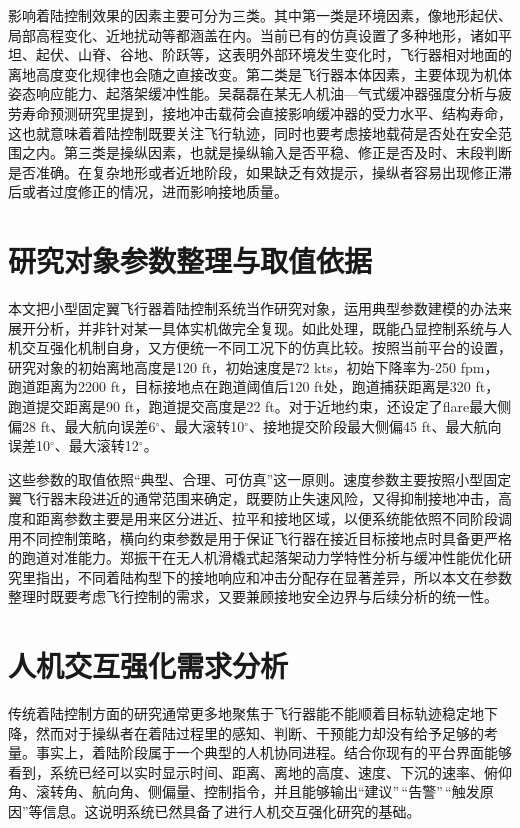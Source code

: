 影响着陆控制效果的因素主要可分为三类。其中第一类是环境因素，像地形起伏、局部高程变化、近地扰动等都涵盖在内。当前已有的仿真设置了多种地形，诸如平坦、起伏、山脊、谷地、阶跃等，这表明外部环境发生变化时，飞行器相对地面的离地高度变化规律也会随之直接改变。第二类是飞行器本体因素，主要体现为机体姿态响应能力、起落架缓冲性能。吴磊磊在某无人机油---气式缓冲器强度分析与疲劳寿命预测研究里提到，接地冲击载荷会直接影响缓冲器的受力水平、结构寿命，这也就意味着着陆控制既要关注飞行轨迹，同时也要考虑接地载荷是否处在安全范围之内。第三类是操纵因素，也就是操纵输入是否平稳、修正是否及时、末段判断是否准确。在复杂地形或者近地阶段，如果缺乏有效提示，操纵者容易出现修正滞后或者过度修正的情况，进而影响接地质量。

\section{研究对象参数整理与取值依据}

本文把小型固定翼飞行器着陆控制系统当作研究对象，运用典型参数建模的办法来展开分析，并非针对某一具体实机做完全复现。如此处理，既能凸显控制系统与人机交互强化机制自身，又方便统一不同工况下的仿真比较。按照当前平台的设置，研究对象的初始离地高度是120
ft，初始速度是72 kts，初始下降率为-250 fpm，跑道距离为2200
ft，目标接地点在跑道阈值后120 ft处，跑道捕获距离是320
ft，跑道提交距离是90 ft，跑道提交高度是22
ft。对于近地约束，还设定了flare最大侧偏28
ft、最大航向误差6$^\circ$、最大滚转10$^\circ$、接地提交阶段最大侧偏45
ft、最大航向误差10$^\circ$、最大滚转12$^\circ$。

这些参数的取值依照``典型、合理、可仿真''这一原则。速度参数主要按照小型固定翼飞行器末段进近的通常范围来确定，既要防止失速风险，又得抑制接地冲击，高度和距离参数主要是用来区分进近、拉平和接地区域，以便系统能依照不同阶段调用不同控制策略，横向约束参数是用于保证飞行器在接近目标接地点时具备更严格的跑道对准能力。郑振干在无人机滑橇式起落架动力学特性分析与缓冲性能优化研究里指出，不同着陆构型下的接地响应和冲击分配存在显著差异，所以本文在参数整理时既要考虑飞行控制的需求，又要兼顾接地安全边界与后续分析的统一性。

\section{人机交互强化需求分析}

传统着陆控制方面的研究通常更多地聚焦于飞行器能不能顺着目标轨迹稳定地下降，然而对于操纵者在着陆过程里的感知、判断、干预能力却没有给予足够的考量。事实上，着陆阶段属于一个典型的人机协同进程。结合你现有的平台界面能够看到，系统已经可以实时显示时间、距离、离地的高度、速度、下沉的速率、俯仰角、滚转角、航向角、侧偏量、控制指令，并且能够输出``建议''\,``告警''\,``触发原因''等信息。这说明系统已然具备了进行人机交互强化研究的基础。

